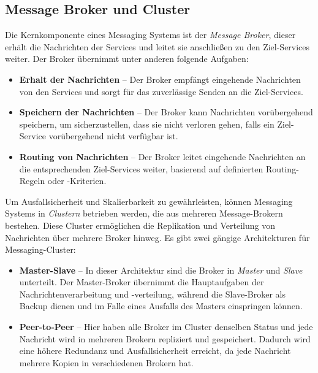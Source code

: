 \subsection{Message Broker und Cluster}

Die Kernkomponente eines Messaging Systems ist der \emph{Message Broker}, dieser erhält die Nachrichten der Services und leitet sie anschließen zu den Ziel-Services weiter. Der Broker übernimmt unter anderen folgende Aufgaben: \cite{narkhedeKafkaDefinitiveGuide2017}

\begin{itemize}
	\item \textbf{Erhalt der Nachrichten} – Der Broker empfängt eingehende Nachrichten von den Services und sorgt für das zuverlässige Senden an die Ziel-Services.
	\item \textbf{Speichern der Nachrichten} – Der Broker kann Nachrichten vorübergehend speichern, um sicherzustellen, dass sie nicht verloren gehen, falls ein Ziel-Service vorübergehend nicht verfügbar ist.
	\item \textbf{Routing von Nachrichten} – Der Broker leitet eingehende Nachrichten an die entsprechenden Ziel-Services weiter, basierend auf definierten Routing-Regeln oder -Kriterien.
\end{itemize}

Um Ausfallsicherheit und Skalierbarkeit zu gewährleisten, können Messaging Systems in \emph{Clustern} betrieben werden, die aus mehreren Message-Brokern bestehen. Diese Cluster ermöglichen die Replikation und Verteilung von Nachrichten über mehrere Broker hinweg. Es gibt zwei gängige Architekturen für Messaging-Cluster: \cite{narkhedeKafkaDefinitiveGuide2017}

\begin{itemize}
	\item \textbf{Master-Slave} – In dieser Architektur sind die Broker in \emph{Master} und \emph{Slave} unterteilt. Der Master-Broker übernimmt die Hauptaufgaben der Nachrichtenverarbeitung und -verteilung, während die Slave-Broker als Backup dienen und im Falle eines Ausfalls des Masters einspringen können.
	\item \textbf{Peer-to-Peer} – Hier haben alle Broker im Cluster denselben Status und jede Nachricht wird in mehreren Brokern repliziert und gespeichert. Dadurch wird eine höhere Redundanz und Ausfallsicherheit erreicht, da jede Nachricht mehrere Kopien in verschiedenen Brokern hat.
\end{itemize}


